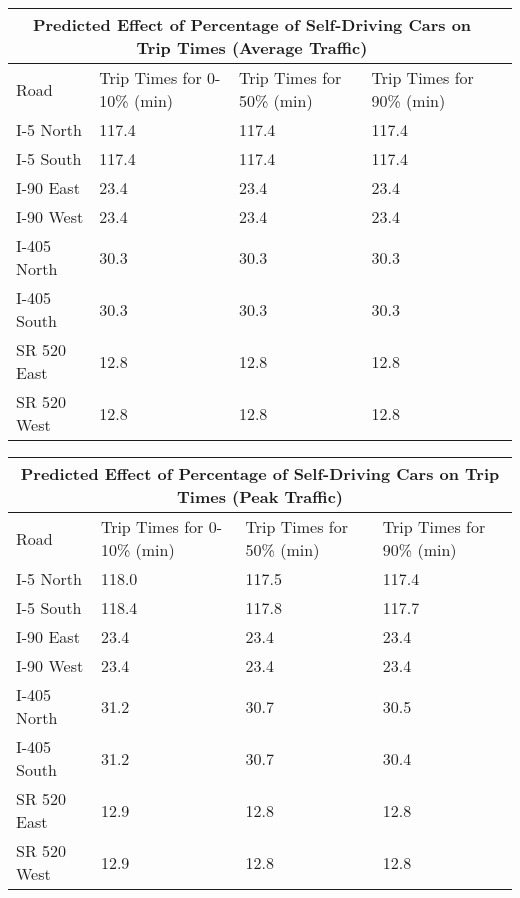 \noindent \begin{tabular}{
|p{3cm}||p{3cm}|p{3cm}|p{3cm}|p{3cm}|
}
 \hline
 \multicolumn{4}{|c|}{Predicted Effect of Percentage of Self-Driving Cars on Trip Times (Average Traffic)} \\
 \hline
Road & Trip Times for 0-10\% (min) & Trip Times for 50\%  (min) & Trip Times for 90\%  (min) \\
 \hline
 I-5 North    & 117.4 & 117.4 & 117.4 \\
 I-5 South    & 117.4 & 117.4 & 117.4 \\
 I-90 East    & 23.4 & 23.4 & 23.4    \\
 I-90 West    & 23.4 & 23.4 & 23.4    \\
 I-405 North  & 30.3 & 30.3 & 30.3    \\
 I-405 South  & 30.3  & 30.3 & 30.3    \\
 SR 520 East  & 12.8 & 12.8 & 12.8    \\
 SR 520 West  & 12.8 & 12.8 & 12.8    \\
 \hline
\end{tabular}

\bigskip

\noindent \begin{tabular}{
|p{3cm}||p{3cm}|p{3cm}|p{3cm}|
}
 \hline
 \multicolumn{4}{|c|}{Predicted Effect of Percentage of Self-Driving Cars on Trip Times (Peak Traffic)} \\
 \hline
 Road & Trip Times for 0-10\% (min) & Trip Times for 50\%  (min) & Trip Times for 90\% (min) \\
 \hline
 I-5 North    & 118.0 & 117.5 & 117.4  \\
 I-5 South    & 118.4  & 117.8 & 117.7  \\
 I-90 East    & 23.4 & 23.4  & 23.4   \\
 I-90 West    & 23.4 & 23.4 & 23.4   \\
 I-405 North  & 31.2  & 30.7 & 30.5  \\
 I-405 South  &  31.2 & 30.7 &  30.4 \\
 SR 520 East  & 12.9  & 12.8 & 12.8  \\
 SR 520 West  & 12.9  & 12.8 & 12.8  \\
 \hline
\end{tabular}

\bigskip

